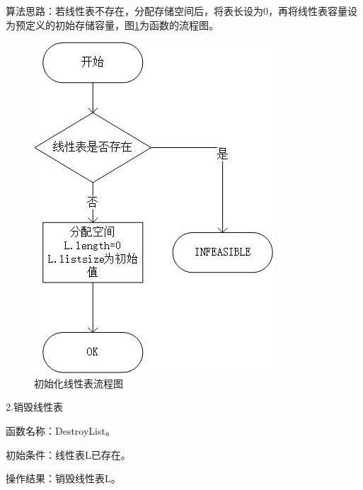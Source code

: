 \documentclass[supercite]{Experimental_Report}
\theoremstyle{definition}
\begin{document}
算法思路：若线性表不存在，分配存储空间后，将表长设为0，再将线性表容量设为预定义的初始存储容量，图\ref{fig1-1}为函数的流程图。
\begin{figure}[htb] %
	\begin{center}
		\includegraphics[scale=1]{./images/顺序表/init.jpg}
		\caption{初始化线性表流程图}
		\label{fig1-1}
	\end{center}
\end{figure}

2.销毁线性表

函数名称：DestroyList。

初始条件：线性表L已存在。

操作结果：销毁线性表L。
\end{document}
